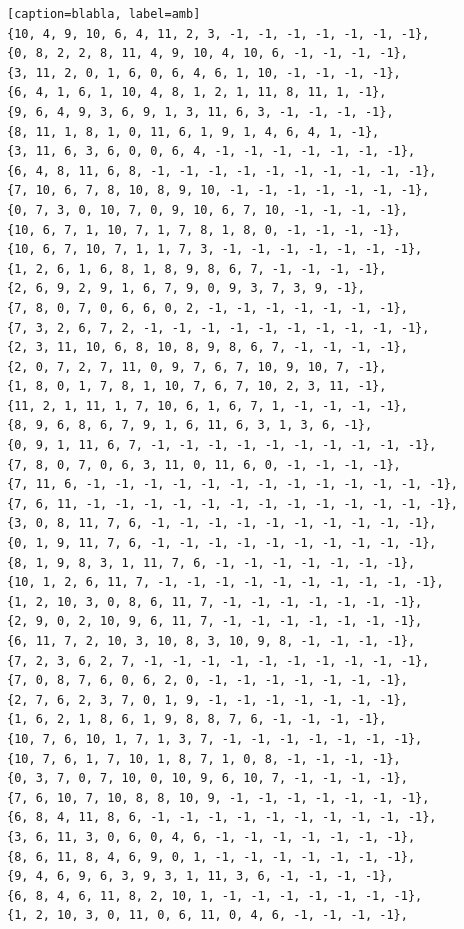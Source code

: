 \documentclass[12pt]{article}
\begin{document}
\begin{lstlisting}[frame=single][caption=blabla, label=amb]
{10, 4, 9, 10, 6, 4, 11, 2, 3, -1, -1, -1, -1, -1, -1, -1},
{0, 8, 2, 2, 8, 11, 4, 9, 10, 4, 10, 6, -1, -1, -1, -1},
{3, 11, 2, 0, 1, 6, 0, 6, 4, 6, 1, 10, -1, -1, -1, -1},
{6, 4, 1, 6, 1, 10, 4, 8, 1, 2, 1, 11, 8, 11, 1, -1},
{9, 6, 4, 9, 3, 6, 9, 1, 3, 11, 6, 3, -1, -1, -1, -1},
{8, 11, 1, 8, 1, 0, 11, 6, 1, 9, 1, 4, 6, 4, 1, -1},
{3, 11, 6, 3, 6, 0, 0, 6, 4, -1, -1, -1, -1, -1, -1, -1},
{6, 4, 8, 11, 6, 8, -1, -1, -1, -1, -1, -1, -1, -1, -1, -1},
{7, 10, 6, 7, 8, 10, 8, 9, 10, -1, -1, -1, -1, -1, -1, -1},
{0, 7, 3, 0, 10, 7, 0, 9, 10, 6, 7, 10, -1, -1, -1, -1},
{10, 6, 7, 1, 10, 7, 1, 7, 8, 1, 8, 0, -1, -1, -1, -1},
{10, 6, 7, 10, 7, 1, 1, 7, 3, -1, -1, -1, -1, -1, -1, -1},
{1, 2, 6, 1, 6, 8, 1, 8, 9, 8, 6, 7, -1, -1, -1, -1},
{2, 6, 9, 2, 9, 1, 6, 7, 9, 0, 9, 3, 7, 3, 9, -1},
{7, 8, 0, 7, 0, 6, 6, 0, 2, -1, -1, -1, -1, -1, -1, -1},
{7, 3, 2, 6, 7, 2, -1, -1, -1, -1, -1, -1, -1, -1, -1, -1},
{2, 3, 11, 10, 6, 8, 10, 8, 9, 8, 6, 7, -1, -1, -1, -1},
{2, 0, 7, 2, 7, 11, 0, 9, 7, 6, 7, 10, 9, 10, 7, -1},
{1, 8, 0, 1, 7, 8, 1, 10, 7, 6, 7, 10, 2, 3, 11, -1},
{11, 2, 1, 11, 1, 7, 10, 6, 1, 6, 7, 1, -1, -1, -1, -1},
{8, 9, 6, 8, 6, 7, 9, 1, 6, 11, 6, 3, 1, 3, 6, -1},
{0, 9, 1, 11, 6, 7, -1, -1, -1, -1, -1, -1, -1, -1, -1, -1},
{7, 8, 0, 7, 0, 6, 3, 11, 0, 11, 6, 0, -1, -1, -1, -1},
{7, 11, 6, -1, -1, -1, -1, -1, -1, -1, -1, -1, -1, -1, -1, -1},
{7, 6, 11, -1, -1, -1, -1, -1, -1, -1, -1, -1, -1, -1, -1, -1},
{3, 0, 8, 11, 7, 6, -1, -1, -1, -1, -1, -1, -1, -1, -1, -1},
{0, 1, 9, 11, 7, 6, -1, -1, -1, -1, -1, -1, -1, -1, -1, -1},
{8, 1, 9, 8, 3, 1, 11, 7, 6, -1, -1, -1, -1, -1, -1, -1},
{10, 1, 2, 6, 11, 7, -1, -1, -1, -1, -1, -1, -1, -1, -1, -1},
{1, 2, 10, 3, 0, 8, 6, 11, 7, -1, -1, -1, -1, -1, -1, -1},
{2, 9, 0, 2, 10, 9, 6, 11, 7, -1, -1, -1, -1, -1, -1, -1},
{6, 11, 7, 2, 10, 3, 10, 8, 3, 10, 9, 8, -1, -1, -1, -1},
{7, 2, 3, 6, 2, 7, -1, -1, -1, -1, -1, -1, -1, -1, -1, -1},
{7, 0, 8, 7, 6, 0, 6, 2, 0, -1, -1, -1, -1, -1, -1, -1},
{2, 7, 6, 2, 3, 7, 0, 1, 9, -1, -1, -1, -1, -1, -1, -1},
{1, 6, 2, 1, 8, 6, 1, 9, 8, 8, 7, 6, -1, -1, -1, -1},
{10, 7, 6, 10, 1, 7, 1, 3, 7, -1, -1, -1, -1, -1, -1, -1},
{10, 7, 6, 1, 7, 10, 1, 8, 7, 1, 0, 8, -1, -1, -1, -1},
{0, 3, 7, 0, 7, 10, 0, 10, 9, 6, 10, 7, -1, -1, -1, -1},
{7, 6, 10, 7, 10, 8, 8, 10, 9, -1, -1, -1, -1, -1, -1, -1},
{6, 8, 4, 11, 8, 6, -1, -1, -1, -1, -1, -1, -1, -1, -1, -1},
{3, 6, 11, 3, 0, 6, 0, 4, 6, -1, -1, -1, -1, -1, -1, -1},
{8, 6, 11, 8, 4, 6, 9, 0, 1, -1, -1, -1, -1, -1, -1, -1},
{9, 4, 6, 9, 6, 3, 9, 3, 1, 11, 3, 6, -1, -1, -1, -1},
{6, 8, 4, 6, 11, 8, 2, 10, 1, -1, -1, -1, -1, -1, -1, -1},
{1, 2, 10, 3, 0, 11, 0, 6, 11, 0, 4, 6, -1, -1, -1, -1},

\end{lstlisting}
\end{document}
